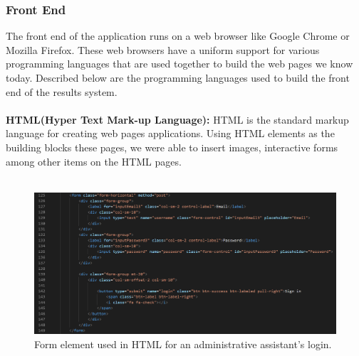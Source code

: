\subsubsection{Front End}
The front end of the application runs on a web browser like Google Chrome or Mozilla Firefox. These web browsers have a uniform support for various programming languages that are used together to build the web pages we know today. Described below are the programming languages used to build the front end of the results system.\\\\
\textbf{HTML(Hyper Text Mark-up Language):} HTML is the standard markup language for creating web pages applications. Using HTML elements as the building blocks these pages, we were able to insert images, interactive forms among other items on the HTML pages.\\\\
\begin{figure}[H]
\includegraphics[scale=0.4]{images/form_snippet.png}
\caption{Form element used in HTML for an administrative assistant's login.}
\end{figure}

